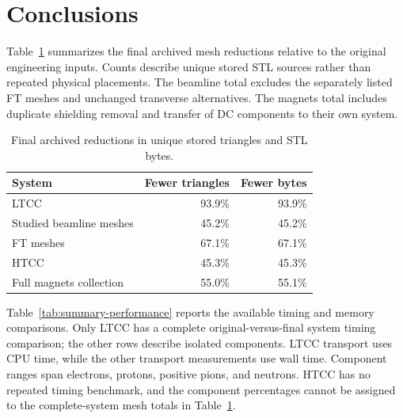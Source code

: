 \FloatBarrier

\section{Conclusions}

Table~\ref{tab:summary-mesh-reductions} summarizes the final archived mesh reductions relative to the original
engineering inputs. Counts describe unique stored STL sources rather than repeated physical placements.
The beamline total excludes the separately listed FT meshes and unchanged transverse alternatives. The
magnets total includes duplicate shielding removal and transfer of DC components to their own system.

\begin{table}[htbp]
\centering
\caption{Final archived reductions in unique stored triangles and STL bytes.}
\label{tab:summary-mesh-reductions}
\begin{tabular}{lrr}
\toprule
System & Fewer triangles & Fewer bytes \\
\midrule
LTCC & 93.9\% & 93.9\% \\
Studied beamline meshes & 45.2\% & 45.2\% \\
FT meshes & 67.1\% & 67.1\% \\
HTCC & 45.3\% & 45.3\% \\
Full magnets collection & 55.0\% & 55.1\% \\
\bottomrule
\end{tabular}
\end{table}

Table~\ref{tab:summary-performance} reports the available timing and memory comparisons. Only LTCC has a
complete original-versus-final system timing comparison; the other rows describe isolated components.
LTCC transport uses CPU time, while the other transport measurements use wall time. Component ranges span
electrons, protons, positive pions, and neutrons. HTCC has no repeated timing benchmark, and the component
percentages cannot be assigned to the complete-system mesh totals in Table~\ref{tab:summary-mesh-reductions}.

